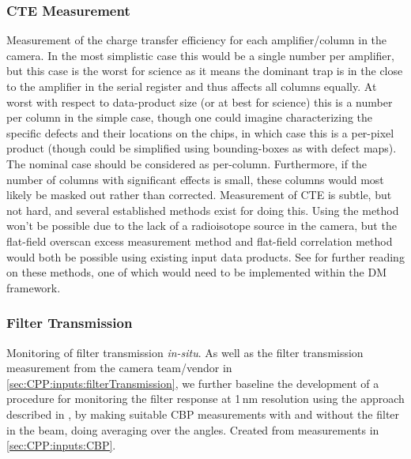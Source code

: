 \subsubsection{CTE Measurement}\label{sec:CPP:output:CTE}
Measurement of the charge transfer efficiency for each amplifier/column in the camera. In the most simplistic case this would be a single number per amplifier, but this case is the worst for science as it means the dominant trap is in the close to the amplifier in the serial register and thus affects all columns equally. At worst with respect to data-product size (or at best for science) this is a number per column in the simple case, though one could imagine characterizing the specific defects and their locations on the chips, in which case this is a per-pixel product (though could be simplified using bounding-boxes as with defect maps). The nominal case should be considered as per-column. Furthermore, if the number of columns with significant effects is small, these columns would most likely be masked out rather than corrected.
\alg Measurement of CTE is subtle, but not hard, and several established methods exist for doing this. Using the \fefiftyfive method won't be possible due to the lack of a radioisotope source in the camera, but the flat-field overscan excess measurement method and flat-field correlation method would both be possible using existing input data products. See \XXX{} for further reading on these methods, one of which would need to be implemented within the DM framework.


\subsubsection{Filter Transmission}\label{sec:CPP:output:filterTransmission}
Monitoring of filter transmission \emph{in-situ}. As well as the filter transmission measurement from the camera team/vendor in \secsymbol\ref{sec:CPP:inputs:filterTransmission}, we further baseline the development of a procedure for monitoring the filter response at 1\,nm resolution using the approach described in \cite{Lupton15}, \ie by making suitable CBP measurements with and without the filter in the beam, doing averaging over the angles.
\alg Created from measurements in \secsymbol\ref{sec:CPP:inputs:CBP}.


